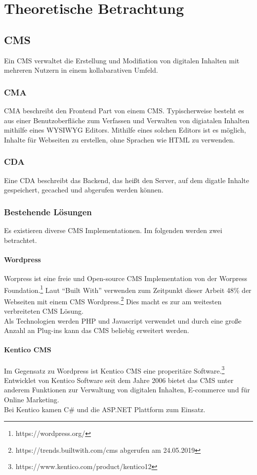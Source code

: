 \chapter{Theoretische Betrachtung}
\section{\acl{CMS}}
Ein \ac{CMS} verwaltet die Erstellung und Modifiation von digitalen Inhalten mit
mehreren Nutzern in einem kollabarativen Umfeld.
\subsection{\acl{CMA}}
\ac{CMA} beschreibt den Frontend Part von einem \ac{CMS}. Typischerweise besteht
es aus einer Benutzoberfläche zum Verfassen und Verwalten von digiatalen
Inhalten mithilfe eines \ac{WYSIWYG} Editors. Mithilfe eines solchen Editors ist
es möglich, Inhalte für Webseiten zu erstellen, ohne Sprachen wie \ac{HTML} zu verwenden.
\subsection{\acl{CDA}}
Eine \ac{CDA} beschreibt das Backend, das heißt den Server, auf dem digatle
Inhalte gespeichert, gecached und abgerufen werden können.
\subsection{Bestehende Lösungen}
Es existieren diverse \ac{CMS} Implementationen. Im folgenden werden
zwei betrachtet.
\subsubsection{Wordpress}
Worpress ist eine freie und Open-source \ac{CMS} Implementation von der Worpress
Foundation.\footnote{https://wordpress.org/} Laut ``Built With'' verwenden zum
Zeitpunkt dieser Arbeit 48\% der Webseiten mit einem \ac{CMS}
Wordpress.\footnote{https://trends.builtwith.com/cms abgerufen am 24.05.2019} Dies
macht es zur am weitesten verbreiteten \ac{CMS} Lösung.\\
Als Technologien werden
PHP und Javascript verwendet und durch eine große Anzahl an Plug-ins kann das
\ac{CMS} beliebig erweitert werden.
\subsubsection{Kentico CMS}
Im Gegensatz zu Wordpress ist Kentico CMS eine properitäre Software.\footnote{https://www.kentico.com/product/kentico12} Entwicklet
von Kentico Software seit dem Jahre 2006 bietet das \ac{CMS} unter anderem Funktionen zur
Verwaltung von digitalen Inhalten, E-commerce und für Online Marketing.\\
Bei Kentico kamen C\# und die ASP.NET Plattform zum Einsatz.

